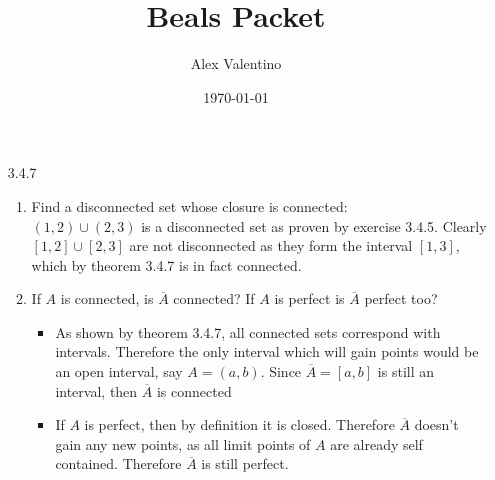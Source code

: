 \documentclass[12pt, letterpaper]{article}
\date{\today}
\author{Alex Valentino}
\title{Beals Packet}
\begin{document}
	\begin{enumerate}
		\item[3.4.7]
		\begin{enumerate}
			\item Find a disconnected set whose closure is connected:\\
			$(1,2)\cup(2,3)$ is a disconnected set as proven by exercise 3.4.5.  
			Clearly $[1,2]\cup [2,3]$ are not disconnected as they form the interval $[1,3]$, which by theorem 3.4.7 is in fact connected.
			\item If $A$ is connected, is $\overline{A}$ connected?  If $A$ is perfect is $\overline{A}$ perfect too?\\
			\begin{itemize}
				\item As shown by theorem 3.4.7, all connected sets correspond with intervals.  Therefore the only interval which will gain points would be an open interval, say $A = (a,b)$.  Since $\overline{A} = [a,b]$ is still an interval, then $\overline{A}$ is connected
				\item If $A$ is perfect, then by definition it is closed.   Therefore $\overline{A}$ doesn't gain any new points, as all limit points of $A$ 
				are already self contained.  Therefore $\overline{A}$ is still
				perfect.  
			\end{itemize}
		\end{enumerate}
	\end{enumerate}
\end{document}
